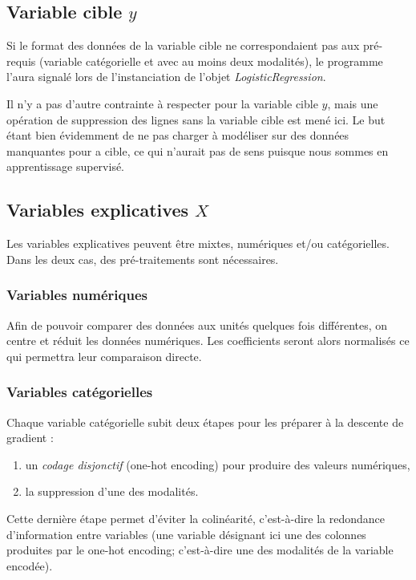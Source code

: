 \documentclass[10pt,french]{report}
\begin{document}
	\subsection{Variable cible $y$}

	Si le format des données de la variable cible ne correspondaient pas aux pré-requis (variable catégorielle et avec au moins deux modalités), le programme l'aura signalé lors de l'instanciation de l'objet \textit{LogisticRegression}.

	Il n'y a pas d'autre contrainte à respecter pour la variable cible $y$, mais une opération de suppression des lignes sans la variable cible est mené ici. Le but étant bien évidemment de ne pas charger à modéliser sur des données manquantes pour a cible, ce qui n'aurait pas de sens puisque nous sommes en apprentissage supervisé.

	\subsection{Variables explicatives $X$}

	Les variables explicatives peuvent être mixtes, numériques et/ou catégorielles. Dans les deux cas, des pré-traitements sont nécessaires.

	\subsubsection{Variables numériques}

	Afin de pouvoir comparer des données aux unités quelques fois différentes, on centre et réduit les données numériques. Les coefficients seront alors normalisés ce qui permettra leur comparaison directe.

	\subsubsection{Variables catégorielles}

	Chaque variable catégorielle subit deux étapes pour les préparer à la descente de gradient :

	\begin{enumerate}
		\item un \textit{codage disjonctif} (one-hot encoding) pour produire des valeurs numériques,
		\item la suppression d'une des modalités.
	\end{enumerate}

	Cette dernière étape permet d'éviter la colinéarité, c'est-à-dire la redondance d'information entre variables (une variable désignant ici une des colonnes produites par le one-hot encoding; c'est-à-dire une des modalités de la variable encodée).
\end{document}
